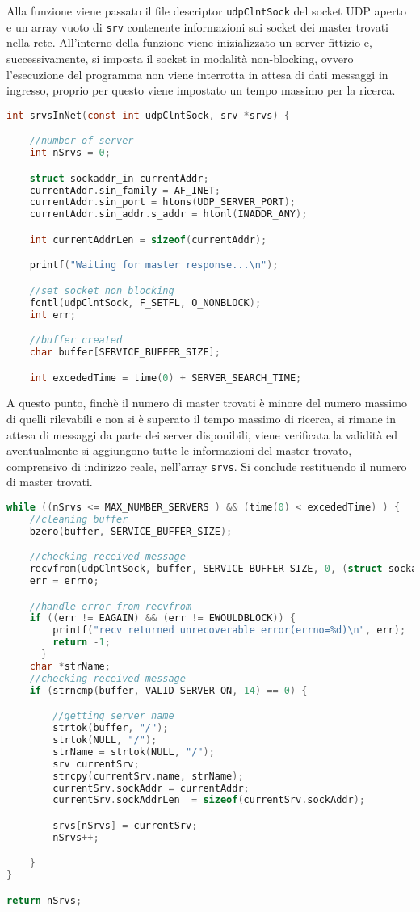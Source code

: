 \documentclass[11pt,fleqn]{book} %
\begin{document}
Alla funzione viene passato il file descriptor \texttt{udpClntSock} del socket UDP aperto e un array vuoto di \texttt{srv} contenente informazioni sui socket dei master trovati nella rete.
All'interno della funzione viene inizializzato un server fittizio e, successivamente, si imposta il socket in modalità non-blocking, ovvero l'esecuzione del programma non viene interrotta in attesa di dati messaggi in ingresso, proprio per questo viene impostato un tempo massimo per la ricerca.
\begin{lstlisting}[language=C]
int srvsInNet(const int udpClntSock, srv *srvs) {

	//number of server
	int nSrvs = 0;

	struct sockaddr_in currentAddr;
	currentAddr.sin_family = AF_INET;
	currentAddr.sin_port = htons(UDP_SERVER_PORT);
	currentAddr.sin_addr.s_addr = htonl(INADDR_ANY);

	int currentAddrLen = sizeof(currentAddr);

	printf("Waiting for master response...\n");

	//set socket non blocking
	fcntl(udpClntSock, F_SETFL, O_NONBLOCK);
	int err;

	//buffer created
	char buffer[SERVICE_BUFFER_SIZE];

	int excededTime = time(0) + SERVER_SEARCH_TIME;
\end{lstlisting}

A questo punto, finchè il numero di master trovati è minore del numero massimo di quelli rilevabili e non si è superato il tempo massimo di ricerca, si rimane in attesa di messaggi da parte dei server disponibili, viene verificata la validità ed aventualmente si aggiungono tutte le informazioni del master trovato, comprensivo di indirizzo reale, nell'array \texttt{srvs}. Si conclude restituendo il numero di master trovati.

\begin{lstlisting}[language=C]
while ((nSrvs <= MAX_NUMBER_SERVERS ) && (time(0) < excededTime) ) {
	//cleaning buffer
	bzero(buffer, SERVICE_BUFFER_SIZE);

	//checking received message
	recvfrom(udpClntSock, buffer, SERVICE_BUFFER_SIZE, 0, (struct sockaddr *) &currentAddr, &currentAddrLen);
	err = errno;

	//handle error from recvfrom
	if ((err != EAGAIN) && (err != EWOULDBLOCK)) {
      	printf("recv returned unrecoverable error(errno=%d)\n", err);
      	return -1;
      }
	char *strName;
	//checking received message
	if (strncmp(buffer, VALID_SERVER_ON, 14) == 0) {

		//getting server name
		strtok(buffer, "/");
		strtok(NULL, "/");
		strName = strtok(NULL, "/");
		srv currentSrv;
		strcpy(currentSrv.name, strName);
		currentSrv.sockAddr = currentAddr;
		currentSrv.sockAddrLen  = sizeof(currentSrv.sockAddr);

		srvs[nSrvs] = currentSrv;
		nSrvs++;

	}	
}

return nSrvs;

\end{lstlisting}
\end{document}
